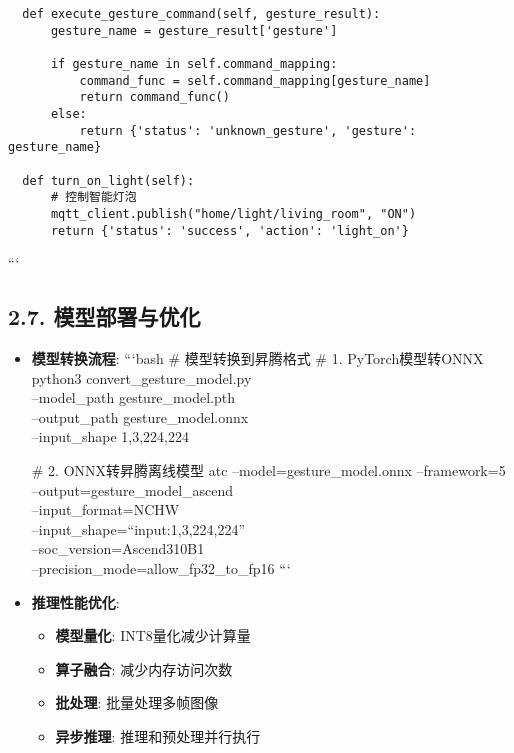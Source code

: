 \begin{itemize}
\begin{lstlisting}
  def execute_gesture_command(self, gesture_result):
      gesture_name = gesture_result['gesture']

      if gesture_name in self.command_mapping:
          command_func = self.command_mapping[gesture_name]
          return command_func()
      else:
          return {'status': 'unknown_gesture', 'gesture': gesture_name}

  def turn_on_light(self):
      # 控制智能灯泡
      mqtt_client.publish("home/light/living_room", "ON")
      return {'status': 'success', 'action': 'light_on'}
\end{lstlisting}

  ```
\end{itemize}

\subsection{2.7.
模型部署与优化}\label{ux6a21ux578bux90e8ux7f72ux4e0eux4f18ux5316}

\begin{itemize}
\item
  \textbf{模型转换流程}: ```bash \# 模型转换到昇腾格式 \# 1.
  PyTorch模型转ONNX python3 convert\_gesture\_model.py\\
  --model\_path gesture\_model.pth\\
  --output\_path gesture\_model.onnx\\
  --input\_shape 1,3,224,224

  \# 2. ONNX转昇腾离线模型 atc --model=gesture\_model.onnx
  --framework=5\\
  --output=gesture\_model\_ascend\\
  --input\_format=NCHW\\
  --input\_shape=``input:1,3,224,224''\\
  --soc\_version=Ascend310B1\\
  --precision\_mode=allow\_fp32\_to\_fp16 ```
\item
  \textbf{推理性能优化}:

  \begin{itemize}
  \tightlist
  \item
    \textbf{模型量化}: INT8量化减少计算量
  \item
    \textbf{算子融合}: 减少内存访问次数
  \item
    \textbf{批处理}: 批量处理多帧图像
  \item
    \textbf{异步推理}: 推理和预处理并行执行
  \end{itemize}
\end{itemize}

